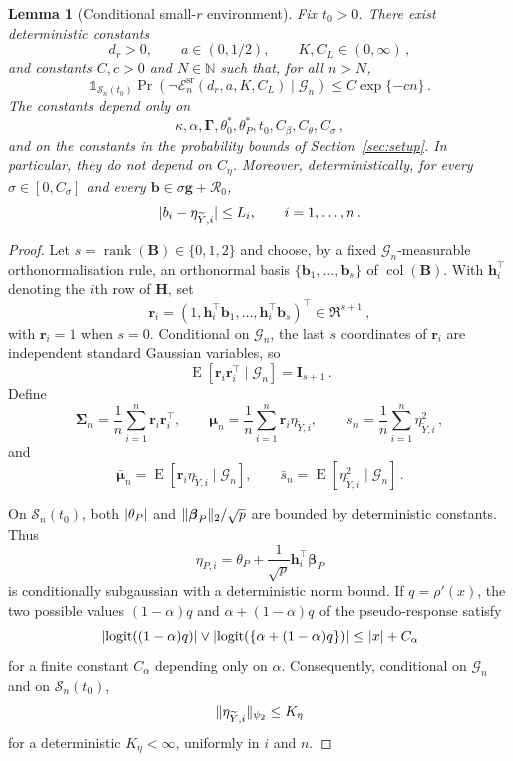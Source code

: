 \documentclass{article}
\makeatletter
\DeclareMathOperator{\expect}{E}
\newtheorem{lemma}{Lemma}
\theoremstyle{definition}
\newcommand{\vnorm}[1]{%
	\ensuremath{%
		\if@display
		\left\| #1 \right\|
		\else
		\| #1 \|
		\fi
	}%
}
\newcommand{\abs}[1]{%
	\ensuremath{%
		\if@display
		\left| #1 \right|
		\else
		\lvert #1 \rvert
		\fi
	}%
}
\newcommand*{\bb}{\boldsymbol}
\newcommand{\logit}[1]{\ensuremath{\textrm{logit}(#1)}}
\def\bH {\bb{H}}
\def\bmu{\bb{\mu}}
\def\bh{\bb{h}}
\def\bg{\bb{g}}
\def\Ytil{\widetilde{Y}}
\def\bSigma{\bb{\Sigma}}
\def\bbeta{\bb{\beta}}
\def\bH{\bb{H}}
\newcommand{\rank}{\operatorname{rank}}
\makeatother
\begin{document}
\begin{bibunit}
\begin{lemma}[Conditional small-$r$ environment]
\label{lemma:small_r_environment}
Fix $t_0>0$. There exist deterministic constants
$$
	d_r>0,
	\qquad
	a\in(0,1/2),
	\qquad
	K,C_L\in(0,\infty)\,,
$$
and constants $C,c>0$ and $N\in\mathbb N$ such that, for all $n>N$,
\begin{equation}
\label{eq:small_r_environment_probability}
	\mathds{1}_{\mathcal S_n(t_0)}
	\Pr\left(
		\lnot\mathcal E_n^{\mathrm{sr}}(d_r,a,K,C_L)
		\mid
		\mathcal G_n
	\right)
	\leq
	C\exp\{-cn\}\,.
\end{equation}
The constants depend only on
$$
	\kappa,
	\alpha,
	\bb\Gamma,
	\theta_0^*,
	\theta_P^*,
	t_0,
	C_\beta,
	C_\theta,
	C_\sigma\,,
$$
and on the constants in the probability bounds of
Section~\ref{sec:setup}. In particular, they do not depend on $C_\eta$.
Moreover, deterministically, for every $\sigma\in[0,C_\sigma]$ and every
$\bb b\in\sigma\bg+\mathcal R_0$,
\begin{equation}
\label{eq:small_r_deterministic_envelope}
	\abs{b_i-\eta_{\Ytil,i}}
	\leq
	L_i,
	\qquad
	i=1,\ldots,n\,.
\end{equation}
\end{lemma}

\begin{proof}
Let $s=\rank(\bb B)\in\{0,1,2\}$ and choose, by a fixed
$\mathcal G_n$-measurable orthonormalisation rule, an orthonormal basis
$\{\bb b_1,\ldots,\bb b_s\}$ of $\operatorname{col}(\bb B)$. With
$\bh_i^\top$ denoting the $i$th row of $\bH$, set
$$
	\bb r_i
	=
	(1,\bh_i^\top\bb b_1,\ldots,\bh_i^\top\bb b_s)^\top
	\in
	\Re^{s+1}\,,
$$
with $\bb r_i=1$ when $s=0$. Conditional on $\mathcal G_n$, the last
$s$ coordinates of $\bb r_i$ are independent standard Gaussian variables,
so
$$
	\expect[
		\bb r_i\bb r_i^\top
		\mid
		\mathcal G_n
	]
	=
	\bb I_{s+1}\,.
$$
Define
$$
	\bSigma_n
	=
	\frac1n\sum_{i=1}^n\bb r_i\bb r_i^\top,
	\qquad
	\bmu_n
	=
	\frac1n\sum_{i=1}^n\bb r_i\eta_{\Ytil,i},
	\qquad
	s_n
	=
	\frac1n\sum_{i=1}^n\eta_{\Ytil,i}^2\,,
$$
and
$$
	\bar{\bmu}_n
	=
	\expect[
		\bb r_i\eta_{\Ytil,i}
		\mid
		\mathcal G_n
	],
	\qquad
	\bar s_n
	=
	\expect[
		\eta_{\Ytil,i}^2
		\mid
		\mathcal G_n
	]\,.
$$

On $\mathcal S_n(t_0)$, both $\abs{\theta_P}$ and
$\vnorm{\bbeta_P}_2/\sqrt p$ are bounded by deterministic constants. Thus
$$
	\eta_{P,i}
	=
	\theta_P
	+
	\frac1{\sqrt p}\bh_i^\top\bbeta_P
$$
is conditionally subgaussian with a deterministic norm bound. If
$q=\rho'(x)$, the two possible values
$(1-\alpha)q$ and $\alpha+(1-\alpha)q$ of the pseudo-response satisfy
$$
	\abs{\logit{(1-\alpha)q}}
	\vee
	\abs{\logit{\{\alpha+(1-\alpha)q\}}}
	\leq
	\abs{x}+C_\alpha
$$
for a finite constant $C_\alpha$ depending only on $\alpha$. Consequently,
conditional on $\mathcal G_n$ and on $\mathcal S_n(t_0)$,
\begin{equation}
\label{eq:small_r_eta_subgaussian}
	\vnorm{\eta_{\Ytil,i}}_{\psi_2}
	\leq
	K_\eta
\end{equation}
for a deterministic $K_\eta<\infty$, uniformly in $i$ and $n$.


\end{proof}
\end{bibunit}
\end{document}
